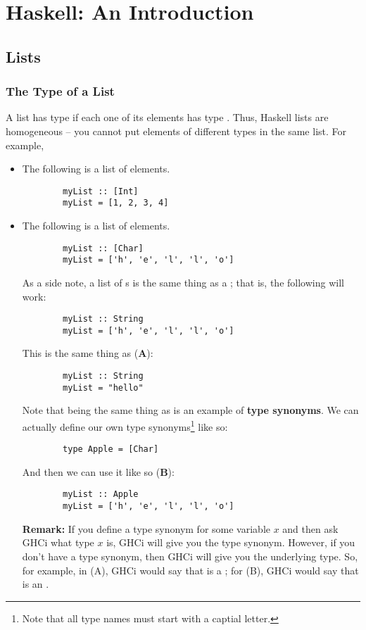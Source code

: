 \documentclass[letterpaper]{article}
\begin{document}
\section{Haskell: An Introduction}
\subsection{Lists}
\subsubsection{The Type of a List}
A list has type \code{[A]} if each one of its elements has type . Thus, Haskell lists are homogeneous -- you cannot put elements of different types in the same list. For example, 
\begin{itemize}
    \item The following is a list of  elements. 
    \begin{verbatim}
        myList :: [Int]
        myList = [1, 2, 3, 4]\end{verbatim}

    \item The following is a list of  elements.  
    \begin{verbatim}
        myList :: [Char]
        myList = ['h', 'e', 'l', 'l', 'o']\end{verbatim}
    As a side note, a list of s is the same thing as a ; that is, the following will work: 
    \begin{verbatim}
        myList :: String
        myList = ['h', 'e', 'l', 'l', 'o']\end{verbatim}
    This is the same thing as (\textbf{A}): 
    \begin{verbatim}
        myList :: String
        myList = "hello"\end{verbatim}
    Note that \code{[Char]} being the same thing as  is an example of \textbf{type synonyms}. We can actually define our own type synonyms\footnote{Note that all type names must start with a captial letter.} like so: 
    \begin{verbatim}
        type Apple = [Char]\end{verbatim}
    And then we can use it like so (\textbf{B}): 
    \begin{verbatim}
        myList :: Apple
        myList = ['h', 'e', 'l', 'l', 'o']\end{verbatim}

    \textbf{Remark:} If you define a type synonym for some variable $x$ and then ask GHCi what type $x$ is, GHCi will give you the type synonym. However, if you don't have a type synonym, then GHCi will give you the underlying type. So, for example, in (A), GHCi would say that  is a \code{[Char]}; for (B), GHCi would say that  is an .



\end{itemize}
\end{document}
